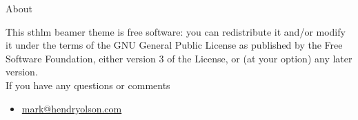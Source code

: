 \documentclass[compress]{beamer}
\begin{document}
%
%

\begin{frame}{About}
	
	This sthlm beamer theme is free software: you can redistribute it and/or modify
	it under the terms of the GNU General Public License as published by
	the Free Software Foundation, either version 3 of the License, or
	(at your option) any later version.\\

	If you have any questions or comments
	\begin{itemize}
		\item \url{mark@hendryolson.com}
	\end{itemize}
\end{frame}
\end{document}
